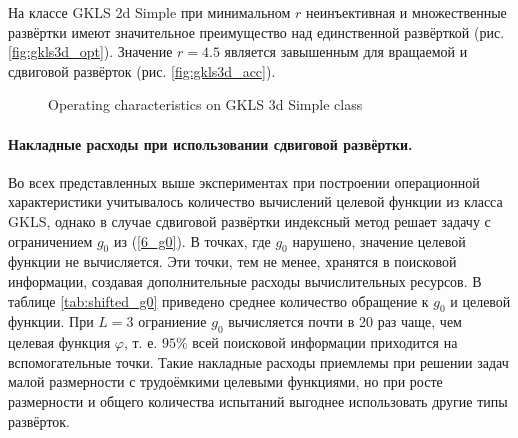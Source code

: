 \documentclass[runningheads]{llncs}
\begin{document}
\begin{Russian}
На классе GKLS 2d Simple при минимальном \(r\) неинъективная и множественные развёртки имеют значительное преимущество над единственной развёрткой (рис. \ref{fig:gkls3d_opt}). Значение \(r=4.5\) является завышенным для вращаемой и сдвиговой развёрток (рис. \ref{fig:gkls3d_acc}).

\begin{figure}[ht]
    \centering
    \caption{Operating characteristics on GKLS 3d Simple class}
\end{figure}

\paragraph{Накладные расходы при использовании сдвиговой развёртки.}
Во всех представленных выше экспериментах при построении операционной характеристики учитывалось количество вычислений целевой функции из класса GKLS, однако в случае сдвиговой развёртки индексный метод решает задачу с ограничением \(g_0\) из (\ref{6_g0}). В точках, где \(g_0\) нарушено, значение целевой функции не вычисляется. Эти точки, тем не менее, хранятся в поисковой информации, создавая дополнительные расходы вычислительных ресурсов. В таблице \ref{tab:shifted_g0} приведено среднее количество обращение к \(g_0\) и целевой функции. При \(L=3\) ограниение \(g_0\) вычисляется почти в 20 раз чаще, чем целевая функция \(\varphi\), т. е. \(95\%\) всей поисковой информации приходится на вспомогательные точки. Такие накладные расходы приемлемы при решении задач малой размерности с трудоёмкими целевыми функциями, но при росте размерности и общего количества испытаний выгоднее использовать другие типы развёрток.


\end{Russian}
\end{document}

